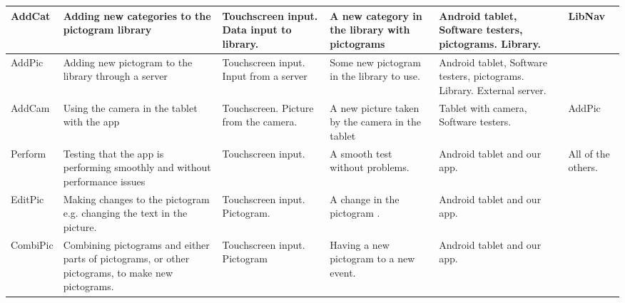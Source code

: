 \begin{sidewaystable}
{\begin{tabular}{|p{2cm}|p{5cm}|p{5cm}|p{5cm}|p{5cm}|p{3cm}|}
        AddCat      & Adding new categories to the pictogram library                                                  & Touchscreen input. Data input to library.            & A new category in the library with pictograms                                     & Android tablet, Software testers,  pictograms.  Library.            & LibNav                              \\ \hline
        AddPic      & Adding new pictogram to the library   through a server                                             & Touchscreen input. Input from a server               & Some new pictogram in the library to use.                                         & Android tablet, Software testers, \newline pictograms. \newline Library. External server. & ~                                   \\ \hline
        AddCam      & Using the camera in the tablet with the app                                                       & Touchscreen.  \newline Picture from the camera.            & A new picture taken by the camera in the tablet                                   & Tablet with camera, Software testers.                                   & AddPic                              \\ \hline
        Perform     & Testing that the app is performing smoothly and without performance issues                         & Touchscreen input.                                   & A smooth test without problems.                                                    & Android tablet and our app.                                             & All of the others.                  \\ \hline
        EditPic     & Making changes to the pictogram e.g. changing the text in the picture.                            & Touchscreen input.  \newline Pictogram.                    & A change in the pictogram .                                                       & Android tablet and our app.                                             & ~                                   \\ \hline
        CombiPic    & Combining pictograms and either parts of pictograms, or other pictograms, to make new pictograms. & Touchscreen \newline  input.  \newline Pictogram                 & Having a new pictogram to a new event.                                            & Android tablet and our app.                                             & ~                                   \\
        \hline
    \end{tabular}}
\end{sidewaystable}

